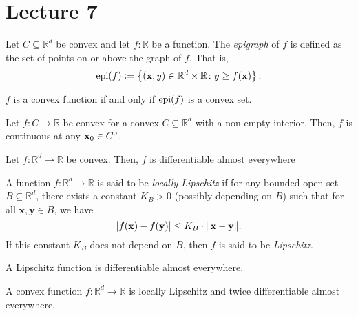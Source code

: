 \section{Lecture 7}

\begin{defn}[Epigraph]
    Let $C \subseteq \mathbb{R}^d$ be convex and let $f \colon \mathbb{R}$ be a function. The \emph{epigraph} of $f$ is defined as the set of points on or above the graph of $f$. That is, 
    \[
        \operatorname*{epi}(f) \vcentcolon= \left\{ (\mathbf{x}, y) \in \mathbb{R}^d \times \mathbb{R} \colon y \geq f(\mathbf{x}) \right\}.
    \]
\end{defn}

\begin{lem}
    $f$ is a convex function if and only if $\operatorname*{epi}(f)$ is a convex set.
\end{lem}
\begin{thm}
    Let $f \colon C \to \mathbb{R}$ be convex for a convex $C \subseteq \mathbb{R}^d$ with a non-empty interior. Then, $f$ is continuous at any $\mathbf{x}_0 \in {\kern0ptC}^{\mathrm{o}}$. 
\end{thm}
\begin{thm}
    Let $f \colon \mathbb{R}^d \to \mathbb{R}$ be convex. Then, $f$ is differentiable almost everywhere
\end{thm}

\begin{defn}
    A function $f \colon \mathbb{R}^d \to \mathbb{R}$ is said to be \emph{locally Lipschitz} if for any bounded open set $B \subseteq \mathbb{R}^d$, there exists a constant $K_B > 0$ (possibly depending on $B$) such that for all $\mathbf{x}, \mathbf{y} \in B$, we have
    \[
        \abs{f(\mathbf{x}) - f(\mathbf{y})} \leq K_B \cdot \norm{\mathbf{x} - \mathbf{y}}.
    \]
    If this constant $K_B$ does not depend on $B$, then $f$ is said to be \emph{Lipschitz}.
\end{defn}

\begin{thm}
    A Lipschitz function is differentiable almost everywhere.
\end{thm}

\begin{thm}
    A convex function $f \colon \mathbb{R}^d \to \mathbb{R}$ is locally Lipschitz and twice differentiable almost everywhere.
\end{thm}

